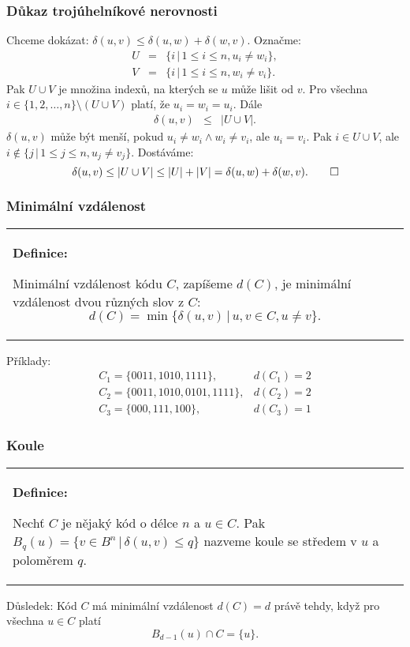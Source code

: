 \documentclass{beamer}
\newenvironment{definice}
{
    \begin{center}
    \begin{tabular}{p{9cm}}
    \textbf{Definice:}
}
{
    \end{tabular}
    \end{center}
}
\newcommand{\sep}{\,|\,}
\begin{document}
\begin{frame}[t,fragile]\frametitle{Důkaz trojúhelníkové nerovnosti} 
Chceme dokázat: $\delta(u,v)\le\delta(u,w)+\delta(w,v)$. Označme:
\begin{eqnarray*}
U&=&\{i\sep 1\le i \le n, u_i\ne w_i\},\\
V&=&\{i\sep 1\le i \le n, w_i\ne v_i\}.
\end{eqnarray*}
Pak $U\cup V$ je množina indexů, na kterých se $u$ může lišit od $v$. Pro všechna $i\in \{1,2,\dots,n\}\setminus(U\cup V)$ platí, že $u_i=w_i=u_i$. Dále
\begin{eqnarray*}
\delta(u,v)&\le&|U\cup V|.
\end{eqnarray*}
$\delta(u,v)$ může být menší, pokud $u_i\ne w_i \wedge w_i\ne v_i$, ale $u_i=v_i$. Pak $i\in U\cup V$, ale $i\notin \{j\sep 1\le j \le n, u_j\ne v_j\}$. Dostáváme:
\begin{equation*}
    \delta(u,v)\le|U\cup V|\le|U|+|V|=\delta(u,w)+\delta(w,v).\qed
\end{equation*}
\end{frame}


\begin{frame}[t,fragile]\frametitle{Minimální vzdálenost} 
\begin{definice}
Minimální vzdálenost kódu $C$, zapíšeme $d(C)$, je minimální vzdálenost dvou různých slov z $C$:
$$
d(C) = \min\{\delta(u,v)\sep u,v\in C, u\ne v\}.
$$
\end{definice}

Příklady:
\begin{eqnarray*}
C_1=\{0011, 1010, 1111\},& d(C_1)=2\\ 
C_2=\{0011, 1010, 0101, 1111\},& d(C_2)=2\\ 
C_3=\{000, 111, 100\},& d(C_3)=1
\end{eqnarray*}
\end{frame}


\begin{frame}[t,fragile]\frametitle{Koule} 
\begin{definice}
Nechť $C$ je nějaký kód o délce $n$ a $u\in C$. Pak $B_q(u)=\{v\in B^n\sep \delta(u,v)\le q\}$ nazveme koule se středem v $u$ a poloměrem $q$.
\end{definice}

Důsledek: Kód $C$ má minimální vzdálenost $d(C)=d$ právě tehdy, když pro všechna $u\in C$ platí
$$
B_{d-1}(u) \cap C = \{u\}.
$$
\end{frame}
\end{document}
